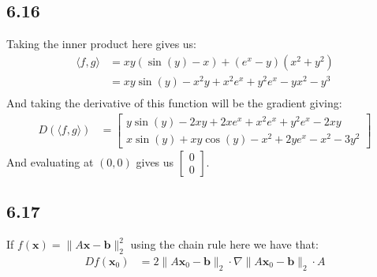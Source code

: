 \documentclass[letterpaper,12pt]{article}
\theoremstyle{definition}
\begin{document}
\subsection*{6.16}
Taking the inner product here gives us:
\begin{align*}
    \langle f, g\rangle &= xy(\sin(y) - x) + (e^x - y)(x^2 + y^2) \\
    &= xy\sin(y) - x^2y + x^2e^x+y^2e^x-yx^2 - y^3 \\
\end{align*}
And taking the derivative of this function will be the gradient giving:
\begin{align*}
    D(\langle f, g\rangle) & = 
    \begin{bmatrix}
        y\sin(y) - 2xy + 2xe^x + x^2e^x+ y^2e^x - 2xy \\
        x\sin(y) + xy\cos(y) - x^2 +2ye^x - x^2 - 3y^2
    \end{bmatrix}
\end{align*}
And evaluating at $(0,0)$ gives us 
$\begin{bmatrix}
0\\
0
\end{bmatrix}$.

\subsection*{6.17}
If $f( \textbf{x}) = \| A \textbf{x} - \textbf{b} \|_2^2 $ using the chain rule here we have that:
\begin{align*}
    D f( \textbf{x}_0) &= 2 \|A \textbf{x}_0 - \textbf{b} \|_2 \cdot \nabla \| A \textbf{x}_0 - \textbf{b} \|_2 \cdot A
\end{align*}
\end{document}
